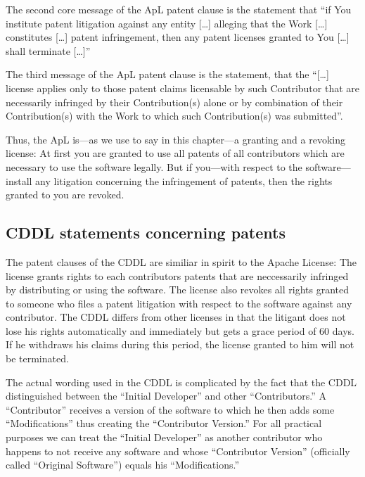 The second core message of the ApL patent clause is the statement that
\enquote{if You institute patent litigation against any entity [\ldots] alleging
that the Work [\ldots] constitutes [\ldots] patent infringement, then any patent
licenses granted to You [\ldots] shall terminate [\ldots]}

The third message of the ApL patent clause is the statement, that the
\enquote{[\ldots] license applies only to those patent claims licensable by such
Contributor that are necessarily infringed by their Contribution(s) alone or by
combination of their Contribution(s) with the Work to which such Contribution(s)
was submitted}.

Thus, the ApL is---as we use to say in this chapter---a granting and a
revoking license: At first you are granted to use all patents of all
contributors which are necessary to use the software legally. But if you---with
respect to the software---install any litigation concerning the infringement of
patents, then the rights granted to you are revoked.

\subsection{CDDL statements concerning patents}\label{subsec:CddlPatentClause}

The patent clauses of the CDDL are similiar in spirit to the Apache License: 
The license grants rights to each contributors patents that are neccessarily
infringed by distributing or using the software. The license also revokes all
rights granted to someone who files a patent litigation with respect to the
software against any contributor.  The CDDL differs from other licenses in that
the litigant does not lose his rights automatically and immediately but gets a
grace period of 60 days. If he withdraws his claims during this period, the
license granted to him will not be terminated.

The actual wording used in the CDDL is complicated by the fact that the CDDL
distinguished between the \enquote{Initial Developer} and other
\enquote{Contributors.}  A \enquote{Contributor} receives a version of the
software to which he then adds some \enquote{Modifications} thus creating the
\enquote{Contributor Version.} For all practical purposes we can treat the
\enquote{Initial Developer} as another contributor who happens to not receive
any software and whose \enquote{Contributor Version} (officially called
\enquote{Original Software}) equals his \enquote{Modifications.}

